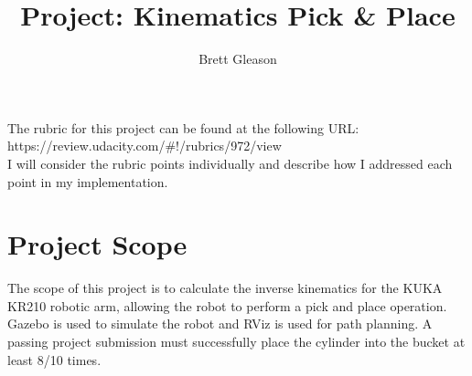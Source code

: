 \documentclass{article}
\begin{document}
\title{Project: Kinematics Pick \& Place}
\author{Brett Gleason}

\maketitle

The rubric for this project can be found at the following URL: \\
https://review.udacity.com/\#!/rubrics/972/view \\
I will consider the rubric points individually and describe how I addressed each point in my implementation.  

\section{Project Scope}
The scope of this project is to calculate the inverse kinematics for the KUKA KR210 robotic arm, allowing the robot to perform a pick and place operation. Gazebo is used to simulate the robot and RViz is used for path planning. A passing project submission must successfully place the cylinder into the bucket at least 8/10 times.
\end{document}
